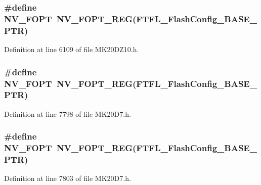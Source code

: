 \subsubsection[{\texorpdfstring{N\+V\+\_\+\+F\+O\+PT}{NV_FOPT}}]{\setlength{\rightskip}{0pt plus 5cm}\#define N\+V\+\_\+\+F\+O\+PT~{\bf N\+V\+\_\+\+F\+O\+P\+T\+\_\+\+R\+EG}({\bf F\+T\+F\+L\+\_\+\+Flash\+Config\+\_\+\+B\+A\+S\+E\+\_\+\+P\+TR})}\hypertarget{group___n_v___register___accessor___macros_gad508c386413905d31c12a2319fa355e3}{}\label{group___n_v___register___accessor___macros_gad508c386413905d31c12a2319fa355e3}


Definition at line 6109 of file M\+K20\+D\+Z10.\+h.

\subsubsection[{\texorpdfstring{N\+V\+\_\+\+F\+O\+PT}{NV_FOPT}}]{\setlength{\rightskip}{0pt plus 5cm}\#define N\+V\+\_\+\+F\+O\+PT~{\bf N\+V\+\_\+\+F\+O\+P\+T\+\_\+\+R\+EG}({\bf F\+T\+F\+L\+\_\+\+Flash\+Config\+\_\+\+B\+A\+S\+E\+\_\+\+P\+TR})}\hypertarget{group___n_v___register___accessor___macros_gad508c386413905d31c12a2319fa355e3}{}\label{group___n_v___register___accessor___macros_gad508c386413905d31c12a2319fa355e3}


Definition at line 7798 of file M\+K20\+D7.\+h.

\subsubsection[{\texorpdfstring{N\+V\+\_\+\+F\+O\+PT}{NV_FOPT}}]{\setlength{\rightskip}{0pt plus 5cm}\#define N\+V\+\_\+\+F\+O\+PT~{\bf N\+V\+\_\+\+F\+O\+P\+T\+\_\+\+R\+EG}({\bf F\+T\+F\+L\+\_\+\+Flash\+Config\+\_\+\+B\+A\+S\+E\+\_\+\+P\+TR})}\hypertarget{group___n_v___register___accessor___macros_gad508c386413905d31c12a2319fa355e3}{}\label{group___n_v___register___accessor___macros_gad508c386413905d31c12a2319fa355e3}


Definition at line 7803 of file M\+K20\+D7.\+h.

